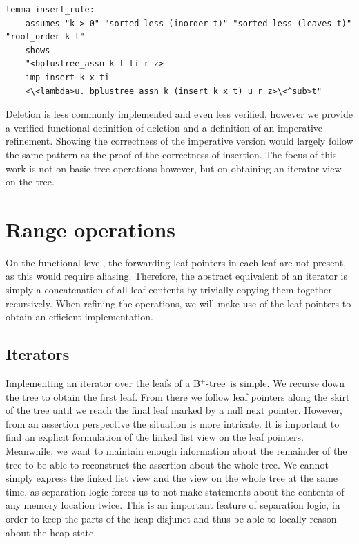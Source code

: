 \documentclass[a4paper,UKenglish,cleveref, autoref, thm-restate]{lipics-v2021}
\newcommand{\btree}{B$^+$-tree}
\begin{document}
\begin{lstlisting}[mathescape=true, language=Isabelle,label=lst:insert-refines]
lemma insert_rule:
    assumes "k > 0" "sorted_less (inorder t)" "sorted_less (leaves t)" "root_order k t"
    shows
    "<bplustree_assn k t ti r z>
    imp_insert k x ti
    <\<lambda>u. bplustree_assn k (insert k x t) u r z>\<^sub>t"
\end{lstlisting}
  

Deletion is less commonly implemented and even less verified,
however we provide a verified functional definition of deletion and a definition of an imperative refinement.
Showing the correctness of the imperative version would largely follow
the same pattern as the proof of the correctness of insertion.
The focus of this work is not on basic tree operations
however, but on obtaining an iterator view on the tree.


\section{Range operations}
\label{sec:range}

On the functional level, the forwarding leaf pointers in each leaf
are not present, as this would require aliasing.
Therefore, the abstract equivalent of an iterator
is simply a concatenation of all leaf contents by
trivially copying them together recursively.
When refining the operations, we will make use of the leaf pointers
to obtain an efficient implementation.

\subsection{Iterators}
\label{sec:imperative_iter}

Implementing an iterator over the leafs of a \btree\ is simple.
We recurse down the tree to obtain the first leaf.
From there we follow leaf
pointers along the skirt of the tree until we reach the final leaf marked by a null next pointer.
However, from an assertion perspective the situation is more intricate.
It is important to find an explicit formulation of the linked list view on the leaf pointers.
Meanwhile, we want to maintain enough information about the remainder of the tree
to be able to reconstruct the assertion about the whole tree.
We cannot simply express the linked list view and the view on the
whole tree at the same time,
as separation logic forces us to not make statements about the contents of
any memory location twice.
This is an important feature of separation logic,
in order to keep the parts of the heap disjunct and
thus be able to locally reason about the heap state.
\end{document}
